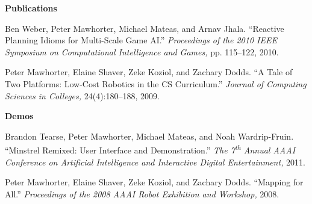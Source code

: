 \documentclass[11pt]{article}
\newenvironment{pubs}[1]{%
  \vspace{8pt}\textbf{\Large #1} \hrulefill\vspace{6pt}
  \begin{adjustwidth}{14pt}{0pt}
  \setlength{\parskip}{4pt}
  \setlength{\parindent}{-8pt}
}{%
  \end{adjustwidth}
}
\newcommand{\fullpub}[5]{#1. ``#2.'' \textit{#3,} #4, #5.}
\newcommand{\nppub}[4]{#1. ``#2.'' \textit{#3,} #4.}
\newcommand{\heading}[1]{\textbf{\large #1}\vspace{4pt}}
\newcommand{\tsup}[1]{\textsuperscript{#1}}
\begin{document}
\begin{pubs}{Publications}
\fullpub{Ben Weber, Peter Mawhorter, Michael Mateas, and Arnav Jhala}{Reactive Planning Idioms for Multi-Scale Game AI}{Proceedings of the 2010 IEEE Symposium on Computational Intelligence and Games}{pp. 115--122}{2010}

\fullpub{Peter Mawhorter, Elaine Shaver, Zeke Koziol, and Zachary Dodds}{A Tale of Two Platforms: Low-Cost Robotics in the CS Curriculum}{Journal of Computing Sciences in Colleges}{24(4):180--188}{2009}

\vspace{6pt}
\heading{Demos}

\nppub{Brandon Tearse, Peter Mawhorter, Michael Mateas, and Noah Wardrip-Fruin}{Minstrel Remixed: User Interface and Demonstration}{The 7\tsup{th} Annual AAAI Conference on Artificial Intelligence and Interactive Digital Entertainment}{2011}

\nppub{Peter Mawhorter, Elaine Shaver, Zeke Koziol, and Zachary Dodds}{Mapping for All}{Proceedings of the 2008 AAAI Robot Exhibition and Workshop}{2008}

\end{pubs}
\end{document}
